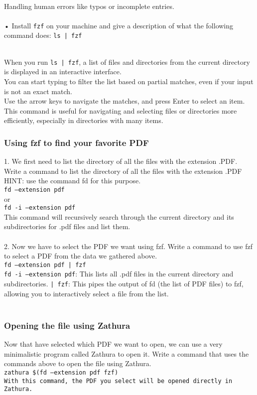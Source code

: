 \documentclass[a4paper,12pt]{article}
\begin{document}
\\Handling human errors like typos or incomplete entries.
\\
\\• Install \texttt{fzf} on your machine and give a description of what the following command does: 
\texttt{ls | fzf}

\\When you run \texttt{ls | fzf}, a list of files and directories from the current directory is displayed in an interactive interface.
\\You can start typing to filter the list based on partial matches, even if your input is not an exact match.
\\Use the arrow keys to navigate the matches, and press Enter to select an item.
\\This command is useful for navigating and selecting files or directories more efficiently, especially in directories with many items.
\subsubsection{Using fzf to find your favorite PDF}
1. We first need to list the directory of all the files with the extension .PDF. Write a
command to list the directory of all the files with the extension .PDF
HINT: use the command fd for this purpose.
\\\texttt{fd --extension pdf}
\\or
\\\texttt{fd -i --extension pdf}
\\This command will recursively search through the current directory and its subdirectories for .pdf files and list them.
\\
\\2. Now we have to select the PDF we want using fzf. Write a command to use fzf to
select a PDF from the data we gathered above.
\\\texttt{fd --extension pdf | fzf}
\\\texttt{fd -i --extension pdf}: This lists all .pdf files in the current directory and subdirectories.
\texttt{| fzf}: This pipes the output of fd (the list of PDF files) to fzf, allowing you to interactively select a file from the list.
\\
\\
\subsubsection{Opening the file using Zathura}
Now that have selected which PDF we want to open, we can use a very minimalistic
program called Zathura to open it. Write a command that uses the commands above to
open the file using Zathura.
\\\texttt{zathura \$(fd --extension pdf \mid fzf)}
\\\texttt{With this command, the PDF you select will be opened directly in Zathura.}
\clearpage
\end{document}
